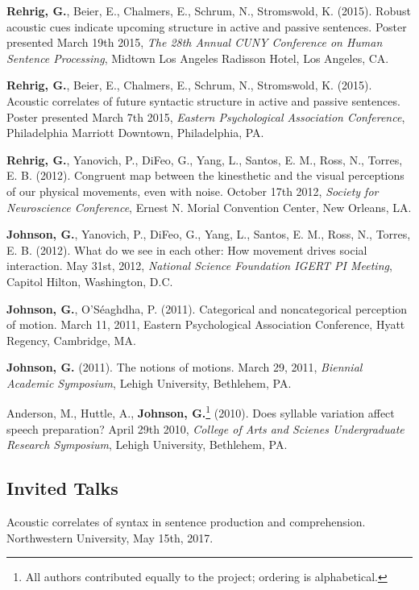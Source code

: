 \textbf{Rehrig, G.}, Beier, E., Chalmers, E., Schrum, N., Stromswold, K. (2015). Robust acoustic cues indicate upcoming structure in active and passive sentences. Poster presented March 19th 2015, \textit{The 28th Annual CUNY Conference on Human Sentence Processing}, Midtown Los Angeles Radisson Hotel, Los Angeles, CA.



\textbf{Rehrig, G.}, Beier, E., Chalmers, E., Schrum, N., Stromswold, K. (2015). Acoustic correlates of future syntactic structure in active and passive sentences. Poster presented March 7th 2015, \textit{Eastern Psychological Association Conference}, Philadelphia Marriott Downtown, Philadelphia, PA.



\textbf{Rehrig, G.}, Yanovich, P., DiFeo, G., Yang, L., Santos, E. M., Ross, N., Torres, E. B. (2012). Congruent map between the kinesthetic and the visual perceptions of our physical movements, even with noise. October 17th 2012, \textit{Society for Neuroscience Conference}, Ernest N. Morial Convention Center, New Orleans, LA.



\textbf{Johnson, G.}, Yanovich, P., DiFeo, G., Yang, L., Santos, E. M., Ross, N., Torres, E. B. (2012). What do we see in each other: How movement drives social interaction. May 31st, 2012, \textit{National Science Foundation IGERT PI Meeting}, Capitol Hilton, Washington, D.C.



\textbf{Johnson, G.}, O'S\'eaghdha, P. (2011). Categorical and noncategorical perception of motion. March 11, 2011, Eastern Psychological Association Conference, Hyatt Regency, Cambridge, MA.



\textbf{Johnson, G.} (2011). The notions of motions. March 29, 2011, \textit{Biennial Academic Symposium}, Lehigh University, Bethlehem, PA.



Anderson, M., Huttle, A., \textbf{Johnson, G.}\footnote{All authors contributed equally to the project; ordering is alphabetical.} (2010). Does syllable variation affect speech preparation? April 29th 2010, \textit{College of Arts and Scienes Undergraduate Research Symposium}, Lehigh University, Bethlehem, PA.

\subsection*{Invited Talks}

Acoustic correlates of syntax in sentence production and comprehension. Northwestern University, May 15th, 2017.